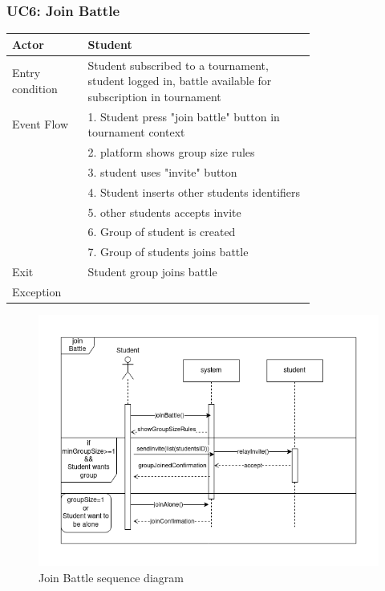 \newpage
\subsubsection{UC6: Join Battle}
\begin{center}
    \begin{longtable}{lp{0.75\linewidth}}
        \hline
            Actor & Student\\
        \hline
            Entry condition & Student subscribed to a tournament, student logged in, battle available for subscription in tournament\\
        \hline
            Event Flow  & 1. Student press "join battle" button in tournament context\\
                        & 2. platform shows group size rules\\
                        & 3. student uses "invite" button\\
                        & 4. Student inserts other students identifiers\\
                        & 5. other students accepts invite\\
                        & 6. Group of student is created\\
                        & 7. Group of students joins battle\\
        \hline
            Exit & Student group joins battle\\
        \hline
            Exception & \\
        \hline
    \end{longtable}
\end{center}

\begin{figure}[H]
    \centering
    \includegraphics[width=1\linewidth]{misc//Images//UC Diagrams/UC6.png}
    \caption{Join Battle sequence diagram}
    \label{fig:enter-label}
\end{figure}

